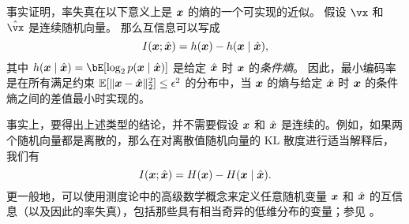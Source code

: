 \documentclass[../../book-main_zh.tex]{subfiles}
\begin{document}
\begin{remark}
	事实证明，率失真在以下意义上是 \(\bm{x}\) 的熵的一个可实现的近似。
	假设 \(\vx\) 和 \(\hat{\vx}\) 是连续随机向量。
	那么互信息可以写成
	\begin{equation}\label{eq:information-entropy}
		I(\bm{x}; \hat{\bm{x}}) = h(\bm{x}) - h(\bm{x} \mid \hat {\bm{x}}),
	\end{equation}
	其中 $h(\x \mid \hat \x) = \bE[\log_2 p(\x \mid \hat\x)]$ 是给定 \(\hat {\bm{x}}\) 时 \(\bm{x}\) 的\textit{条件熵}。
	因此，最小编码率是在所有满足约束 $\mathbb{E} [\norm{\x- \hat \x}_2^2] \le \epsilon^2$ 的分布中，当 \(\bm{x}\) 的熵与给定 \(\hat {\bm{x}}\) 时 \(\bm{x}\) 的条件熵之间的差值最小时实现的。

	事实上，要得出上述类型的结论，并不需要假设 \(\bm{x}\) 和 \(\hat {\bm{x}}\) 是连续的。例如，如果两个随机向量都是离散的，那么在对离散值随机向量的 KL 散度进行适当解释后，我们有
	\begin{equation}
		I(\bm{x}; \hat{\bm{x}}) = H(\bm{x}) - H(\bm{x} \mid \hat {\bm{x}}).
	\end{equation}
	更一般地，可以使用测度论中的高级数学概念来定义任意随机变量 \(\bm{x}\) 和 \(\hat {\bm{x}}\) 的互信息（以及因此的率失真），包括那些具有相当奇异的低维分布的变量；参见 \textcite[\S 8.5]{Cover-Thomas}。
\end{remark}
\end{document}
